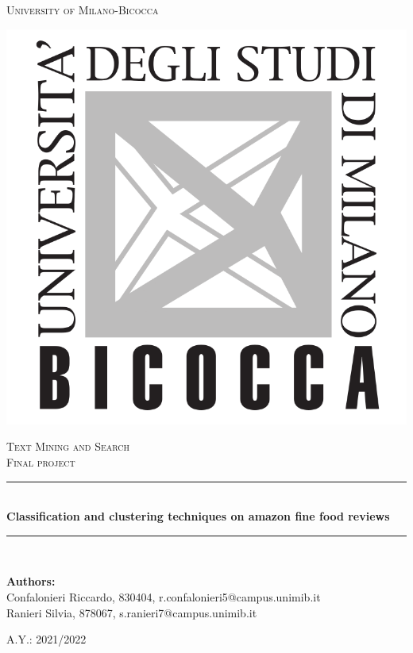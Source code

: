 \documentclass[11pt]{article}
\begin{document}
\begin{titlepage}
    \thispagestyle{empty}
    \newcommand{\HRule}{\rule{\linewidth}{0.5mm}}
    \hspace{1cm}
    \center
    
    \textsc{\huge University of Milano-Bicocca}\\[0.5cm]
    
    \begin{center}
		\includegraphics[scale = 0.25]{logoUnimib.png}\\[2cm]
	\end{center}
    
    \textsc{\LARGE Text Mining and Search\\
    \Large Final project}\\
    
    \HRule\\[0.5cm]
    { \huge \bfseries Classification and clustering techniques on amazon fine food reviews} 
    \HRule \\[2cm]
    
    \begin{center}
    	\textbf{Authors:}\\
    	Confalonieri Riccardo, 830404, r.confalonieri5@campus.unimib.it\\
    	Ranieri Silvia, 878067, s.ranieri7@campus.unimib.it
    \end{center}
    
    \vspace{7cm}
    
    \begin{center}
    	A.Y.: 2021/2022
    \end{center}
\end{titlepage}
\end{document}
